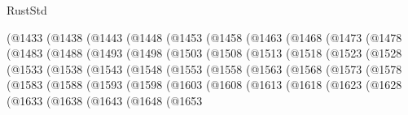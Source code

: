 \begin{lexlean}{RustStd}
\begin{coremodule}
        (@1433
          (@1438
            (@1443
              (@1448
                (@1453
                  (@1458
                    (@1463
                      (@1468
                        (@1473
                          (@1478
                            (@1483
                              (@1488
                                (@1493
                                  (@1498
                                    (@1503
                                      (@1508
                                        (@1513
                                          (@1518
                                            (@1523
                                              (@1528
                                                (@1533
                                                  (@1538
                                                    (@1543
                                                      (@1548
                                                        (@1553
                                                          (@1558
                                                            (@1563
                                                              (@1568
                                                                (@1573
                                                                  (@1578
                                                                    (@1583
                                                                      (@1588
                                                                        (@1593
                                                                          (@1598
                                                                            (@1603
                                                                              (@1608
                                                                                (@1613
                                                                                  (@1618
                                                                                    (@1623
                                                                                      (@1628
                                                                                        (@1633
                                                                                          (@1638
                                                                                            (@1643
                                                                                              (@1648
                                                                                                (@1653

\end{coremodule}
\end{lexlean}
